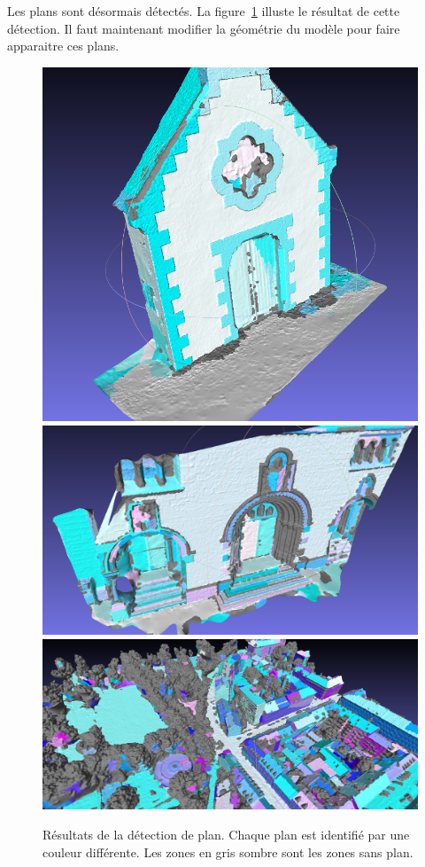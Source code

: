 \documentclass[12pt, twoside]{article}
\begin{document}
Les plans sont désormais détectés. La figure~\ref{fig:resultPlan} illuste le résultat de cette détection. Il faut maintenant modifier la géométrie du modèle pour faire apparaitre ces plans.

\begin{figure}[h]
\centering
\includegraphics[scale=0.3]{Plan1.png} \includegraphics[scale=0.3]{Plan2.png} \includegraphics[scale=0.3]{Plan3.png}
\caption{\label{fig:resultPlan} Résultats de la détection de plan. Chaque plan est identifié par une couleur différente. Les zones en gris sombre sont les zones sans plan.}
\end{figure}
\end{document}
